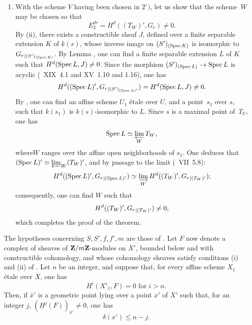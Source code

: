 \begin{enumerate}
\item[$3^\circ)$]
With the scheme $V$ having been chosen in $2^\circ)$, let us show that the scheme~$W$ may be chosen so that
$$
E^{dr}_2 = H^d((T_W)', G_r) \neq 0.
$$
By \textup{(ii)}, there exists a constructible sheaf $J$, defined over a finite separable extension $K$ of $k(s)$, whose inverse image on $(S')_{(\Spec K)}$ is isomorphic to $\sisi{{G_r}{|(S')_{(\Spec K)}}}{{G_r}_{|(S')_{(\Spec K)}}}$. By Lemma , one can find a finite separable extension $L$ of $K$ such that $H^d(\Spec L, J) \neq 0$. Since the morphism $(S')_{(\Spec L)} \to \Spec L$ is acyclic (~XIX~4.1 and XV~1.10 and 1.16), one has
$$
H^d((\Spec L)', \sisi{{G_r}{|(S')_{(\Spec L)'}}}{{G_r}_{|(S')_{(\Spec L)'}}}) = H^d(\Spec L, J) \neq 0.
$$
By , one can find an affine scheme $U_1$ \'{e}tale over $U$, and a point~$s_1$ over $s$, such that $k(s_1)$ is $k(s)$-isomorphic to $L$. Since $s$ is a maximal point of~$T_U$, one has
$$
\Spec L \simeq \varprojlim_W T_W,
$$
where\pageoriginaled $W$ ranges over the affine open neighborhoods of $s_1$. One deduces that $(\Spec L)' \simeq \varprojlim_W(T_W)'$, and by passage to the limit (~VII~5.8):
$$
H^d((\Spec L)', \sisi{{G_r}{|(\Spec L)'}}{{G_r}_{|(\Spec L)'}}) \simeq \varinjlim_W H^d((T_W)', \sisi{{G_r}{|(T_W)'}}{{G_r}_{|(T_W)'}});
$$
consequently, one can find $W$ such that
$$
H^d((T_W)', \sisi{{G_r}{|(T_W)'}}{{G_r}_{|(T_W)'}})\neq 0,
$$
which completes the proof of the theorem.
\end{enumerate}

\begin{corollaire} \label{XIV.3.6}
The hypotheses concerning $S, S', f, f', m$ are those of . Let $F$ now denote a complex of sheaves of $\ZZ/m\ZZ$-modules on $X'$, bounded below and with constructible cohomology, and whose cohomology sheaves satisfy conditions \textup{(i)} and \textup{(ii)} of . Let $n$ be an integer, and suppose that, for every affine scheme $X_1$ \'{e}tale over $X$, one has
$$
H^i(X'_1, F)=0\text{ for } i>n.
$$
Then, if $\bar{x}'$ is a geometric point lying over a point $x'$ of $X'$ such that, for an integer $j$, $(\underline{H}^j(F))_{\bar{x}'} \neq 0$, one has
$$
\delta(x')\leq n-j.
$$
\end{corollaire}

